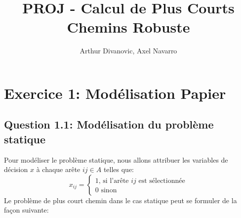 \documentclass{article}
\title{PROJ - Calcul de Plus Courts Chemins Robuste}
\author{Arthur Divanovic, Axel Navarro}
\begin{document}
\maketitle



\newpage
\tableofcontents

\newpage 
\section{Exercice 1: Modélisation Papier}

\subsection{Question 1.1: Modélisation du problème statique}

Pour modéliser le problème statique, nous allons attribuer les variables de décision $x$ à chaque arête $ij \in A$ telles que:
$$  x_{ij} = 
\begin{cases}
  1 \text{, si l'arête $ij$ est sélectionnée} \\
    0 \text{ sinon}
\end{cases}$$
Le problème de plus court chemin dans le cas statique peut se formuler de la façon suivante:
\end{document}
